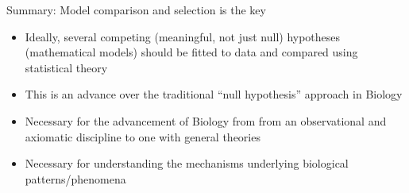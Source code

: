 \documentclass[xcolor=x11names,compress]{beamer}
\renewcommand{\(}{\begin{columns}}
\renewcommand{\)}{\end{columns}}
\newcommand{\<}[1]{\begin{column}{#1}}
\renewcommand{\>}{\end{column}}
\begin{document}
\begin{frame}{Summary: Model comparison and selection is the key}

\begin{itemize}[<+->]\itemsep12pt
	\item Ideally, several competing (meaningful, not just null) hypotheses (mathematical models) should be fitted to data and compared using statistical theory 
	\item This is an advance over the traditional ``null hypothesis'' approach in Biology
	\item Necessary for the advancement of Biology from from an observational and axiomatic discipline to one with general theories
	\item Necessary for understanding the mechanisms underlying biological patterns/phenomena
\end{itemize}
 
 \end{frame}
  


	



	
		

		
\end{document}
